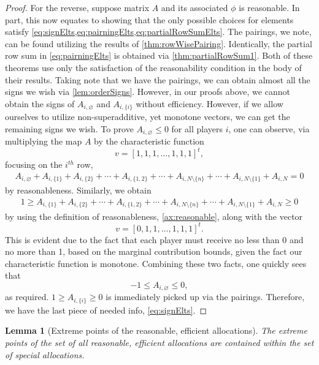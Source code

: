 \documentclass[12pt,letterpaper,final]{article}
\theoremstyle{plain}
\theoremstyle{plain}
\theoremstyle{plain}
\newtheorem{lemma}[theorem]{Lemma}
\theoremstyle{plain}
\theoremstyle{plain}
\theoremstyle{plain}
\theoremstyle{plain}
\theoremstyle{definition}
\theoremstyle{definition}
\theoremstyle{definition}
\theoremstyle{definition}
\theoremstyle{definition}
\theoremstyle{remark}
\theoremstyle{remark}
\theoremstyle{remark}
\theoremstyle{remark}
\begin{document}
\begin{proof}
  For the reverse, suppose matrix \(A\) and its associated
  \(\phi\)  is reasonable. In part, this 
  now equates to showing that the only possible choices for elements
  satisfy \cref{eq:signElts,eq:pairningElts,eq:partialRowSumElts}. The
  pairings, we note, can be found utilizing the results of
  \cref{thm:rowWisePairing}. Identically, the partial row sum in
  \cref{eq:pairningElts} is obtained via
  \cref{thm:partialRowSum1}. Both of these theorems use only the
  satisfaction of the reasonability condition in the body of their
  results. Taking note that we have the pairings, we can obtain almost
  all the signs we wish via \cref{lem:orderSigns}. However, in our
  proofs above, we cannot obtain the signs of \(A_{i,\varnothing}\)
  and \(A_{i,\{i\}}\) without efficiency. However, if we allow
  ourselves to utilize non-superadditive, yet monotone vectors, we
  can get the remaining signs we wish.
  To prove \(A_{i,\varnothing} \leq 0\) for all players \(i\), one can 
  observe, via multiplying the map \(A\) by the characteristic function
  \[v={\left[1,1,1,\ldots,1,1,1\right]}^t,\] focusing on the
  \(i^{th}\) row,  
  \begin{multline*}
    A_{i,\varnothing}+A_{i,\{1\}}+A_{i,\{2\}}+ \cdots 
    + A_{i,\{1,2\}}+\cdots +A_{i,N\setminus\{n\}} +\cdots
    +A_{i,N\setminus\{1\}}+A_{i,N} = 0
  \end{multline*}
  by reasonableness.  Similarly, we obtain
  \begin{multline*}
    1 \geq A_{i,\{1\}}+A_{i,\{2\}}+ \cdots 
    + A_{i,\{1,2\}}+\cdots +A_{i,N\setminus\{n\}} +\cdots 
    +A_{i,N\setminus\{1\}}+A_{i,N} \geq 0
  \end{multline*}
  by using the definition of reasonableness, \cref{ax:reasonable}, along with the vector
  \[v={\left[ 0,1,1,\ldots,1,1,1 \right]}^t.\]
  This is evident due to the fact that each player must receive no
  less than 0 and no more than 1, based on the marginal contribution
  bounds, given the fact our characteristic
  function is monotone. Combining these two facts, one quickly sees
  that
  \begin{equation}
    -1 \leq A_{i,\varnothing} \leq 0,
  \end{equation}
  as required. \(1 \geq A_{i,\{i\}}\geq 0\) is immediately picked up
  via the pairings. Therefore, we have the last piece of needed info,
  \cref{eq:signElts}.
\end{proof}

\begin{lemma}[Extreme points of the reasonable, efficient allocations]\label{lem:raavExtremePts}
  The extreme points of the set of all reasonable, efficient
  allocations are contained within   the set of special allocations.
\end{lemma}
\end{document}
